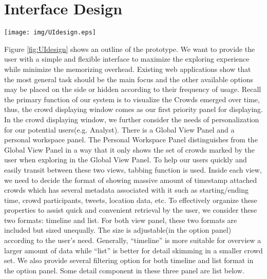 \documentclass{sig-alternate}
\begin{document}
\section{Interface Design}

\begin{figure*}[t]
\centering
\texttt{[image: img/UIdesign.eps]}
\caption{Crowdy User Interface Design}
\label{fig:UIdesign}
\end{figure*}

Figure \ref{fig:UIdesign} shows an outline of the prototype. We want to provide
the user with a simple and flexible interface to maximize the exploring
experience while minimize the memorizing overhead. Existing web applications
show that the most general task should be the main focus and the other
available options may be placed on the side or hidden according to their
frequency of usage. Recall the primary function of our system is to visualize
the Crowds emerged over time, thus, the crowd displaying window comes as our
first priority panel for displaying. In the crowd displaying window, we further
consider the needs of personalization for our potential users(e.g. Analyst).
There is a Global View Panel and a personal workspace panel. The Personal
Workspace Panel distinguishes from the Global View Panel in a way that it only
shows the set of crowds marked by the user when exploring in the Global View
Panel. To help our users quickly and easily transit between these two views,
tabbing function is used. Inside each view, we need to decide the format of
showing massive amount of timestamp attached crowds which has several metadata
associated with it such as starting/ending time, crowd participants, tweets,
location data, etc. To effectively organize these properties to assist quick
and convenient retrieval by the user, we consider these two formats: timeline
and list. For both view panel, these two formats are included but sized
unequally. The size is adjustable(in the option panel) according to the user's
need. Generally, ``timeline'' is more suitable for overview a larger amount of
data while ``list'' is better for detail skimming in a smaller crowd set. We
also provide several filtering option for both timeline and list format in the
option panel. Some detail component in these three panel are list below.
\end{document}
